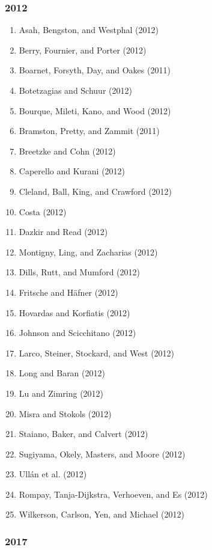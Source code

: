 \documentclass[english,man]{apa6}
\providecommand{\tightlist}{%
  \setlength{\itemsep}{0pt}\setlength{\parskip}{0pt}}
\begin{document}
\subsubsection{2012}\label{section-20}

\begin{enumerate}
\def\labelenumi{\arabic{enumi})}
\tightlist
\item
  Asah, Bengston, and Westphal (2012)
\item
  Berry, Fournier, and Porter (2012)
\item
  Boarnet, Forsyth, Day, and Oakes (2011)
\item
  Botetzagias and Schuur (2012)
\item
  Bourque, Mileti, Kano, and Wood (2012)
\item
  Bramston, Pretty, and Zammit (2011)
\item
  Breetzke and Cohn (2012)
\item
  Caperello and Kurani (2012)
\item
  Cleland, Ball, King, and Crawford (2012)
\item
  Costa (2012)
\item
  Dazkir and Read (2012)
\item
  Montigny, Ling, and Zacharias (2012)
\item
  Dills, Rutt, and Mumford (2012)
\item
  Fritsche and Häfner (2012)
\item
  Hovardas and Korfiatis (2012)
\item
  Johnson and Scicchitano (2012)
\item
  Larco, Steiner, Stockard, and West (2012)
\item
  Long and Baran (2012)
\item
  Lu and Zimring (2012)
\item
  Misra and Stokols (2012)
\item
  Staiano, Baker, and Calvert (2012)
\item
  Sugiyama, Okely, Masters, and Moore (2012)
\item
  Ullán et al. (2012)
\item
  Rompay, Tanja-Dijkstra, Verhoeven, and Es (2012)
\item
  Wilkerson, Carlson, Yen, and Michael (2012)
\end{enumerate}

\subsubsection{2017}\label{section-21}
\end{document}
